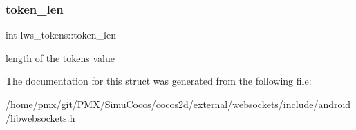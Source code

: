 \subsubsection{\texorpdfstring{token\+\_\+len}{token\_len}}
{\footnotesize\ttfamily int lws\+\_\+tokens\+::token\+\_\+len}

length of the token\textquotesingle{}s value 

The documentation for this struct was generated from the following file\+:\begin{DoxyCompactItemize}
\item 
/home/pmx/git/\+P\+M\+X/\+Simu\+Cocos/cocos2d/external/websockets/include/android/libwebsockets.\+h\end{DoxyCompactItemize}
